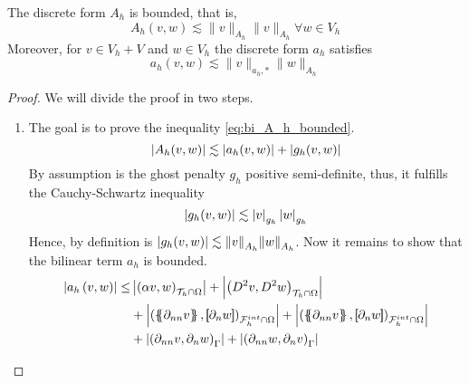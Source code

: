 \begin{lemma}
    The discrete form $A_{h}$ is bounded, that is,
    \begin{equation}
    \label{eq:bi_A_h_bounded}
     A_{h}( v,w) \lesssim \| v \|_{A_{h}  }^{  }\| v \|_{A_{h}  }^{  }  \forall w \in V_{h}
    \end{equation}
    Moreover, for $v \in V_{h} + V$  and $w \in V_{h}$ the discrete form $a_{h}$ satisfies
    \begin{equation}
        \label{eq:bi_a_h_bounded}
        a_{h} ( v,w) \lesssim \| v \|_{ a_{h},* }^{  } \| w \|_{ A_{h} }^{  }
    \end{equation}
\end{lemma}

\begin{proof}
    We will divide the proof in two steps.
    \begin{enumerate}[label=\arabic*)]
        \item The goal is to prove the inequality \eqref{eq:bi_A_h_bounded}. \[
                \left\lvert  A_{h}( v ,w )  \right\rvert \lesssim   \left\lvert a_{h}( v, w)  \right\rvert   + \left\lvert g_{h}( v,w)   \right\rvert          \]
                By assumption is the ghost penalty $g_{h}$ positive semi-definite, thus, it fulfills the Cauchy-Schwartz inequality \[
                \left\lvert  g_{h}(v,w )  \right\rvert \lesssim \left\lvert  v  \right\rvert _{g_{h}}\left\lvert  w  \right\rvert_{g_{h}}
                \]
                Hence, by definition is $\left\lvert  g_{h}(v,w )  \right\rvert \lesssim \| v \|_{ A_{h} }^{  } \| w \|_{ A_{h} }^{  } $. Now it remains to show that the bilinear term $ a_{h}$ is bounded.
                \begin{equation}
                    \begin{split}
                        \abs{ a_{h} \left( v, w \right) }   \le  &   \abs{\left( \alpha  v, w \right) _{\mathcal{T} _{h} \cap \Omega }  }    +  \abs{\left( D^2 v, D^2w \right) _{\mathcal{T} _{h} \cap \Omega}  }  \\
                                                     & + \abs{\left( \mean{  \partial _{n n} v }, \jump{ \partial _{n }w} \right)_{\mathcal{F}_{h}^{int} \cap \Omega}  }   +
                                                     \abs{\left( \mean{ \partial _{nn } v }, \jump{ \partial _{n}w }      \right)_{\mathcal{F}_{h}^{int} \cap \Omega}  } \\
                                                     & + \abs{\left(  \partial _{n n} v ,  \partial _{n }w \right)_{\Gamma }}     +
                                                     \abs{\left(  \partial _{n n} w ,  \partial _{n}v       \right)_{\Gamma }  }

\end{split}
\end{equation}
\end{enumerate}
\end{proof}
